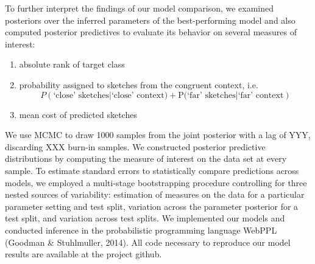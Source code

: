 \documentclass[9pt,twocolumn,twoside]{pnas-new}
\begin{document}
{To further interpret the findings of our model comparison, we examined posteriors over the inferred parameters of the best-performing model and also computed posterior predictives to evaluate its behavior on several measures of interest:
\begin{enumerate}
    \item absolute rank of target class
    \item probability assigned to sketches from the congruent context, i.e. $$P(\textrm{`close' sketches} | \textrm{`close' context)} + \textrm{P(`far' sketches} | \textrm{`far' context})$$
    \item mean cost of predicted sketches
\end{enumerate}
We use MCMC to draw 1000 samples from the joint posterior with a lag of YYY, discarding XXX burn-in samples.
We constructed posterior predictive distributions by computing the measure of interest on the data set at every sample.
To estimate standard errors to statistically compare predictions across models, we employed a multi-stage bootstrapping procedure controlling for three nested sources of variability: estimation of measures on the data for a particular parameter setting and test split, variation across the parameter posterior for a test split, and variation across test splits.
We implemented our models and conducted inference in the probabilistic programming language WebPPL (Goodman \& Stuhlmuller, 2014).
All code necessary to reproduce our model results are available at the project github.

}

\showmatmethods %


\showacknow{} %



\end{document}
